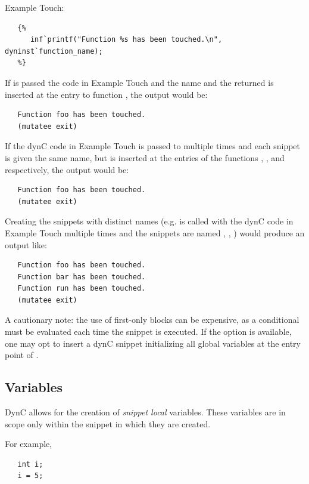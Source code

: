 \noindent Example Touch:
\begin{lstlisting}
   {%
      inf`printf("Function %s has been touched.\n", dyninst`function_name);
   %}
\end{lstlisting}

If  is passed the code in Example Touch and the name
 and the returned  is inserted at the entry to function , the output would be:
\begin{lstlisting}
   Function foo has been touched.
   (mutatee exit)
\end{lstlisting}

If the dynC code in Example Touch is passed to  multiple times and each snippet is given the same name, but is inserted at the entries of the functions , , and  respectively, the output would be:

\begin{lstlisting}
   Function foo has been touched.
   (mutatee exit)
\end{lstlisting}

Creating the snippets with distinct names (e.g.  is called with the dynC code in Example Touch multiple times and the snippets are named , , ) would produce an output like:

\begin{lstlisting}
   Function foo has been touched.
   Function bar has been touched.
   Function run has been touched.
   (mutatee exit)
\end{lstlisting}

A cautionary note: the use of first-only blocks can be expensive, as a
conditional must be evaluated each time the snippet is executed. If the option
is available, one may opt to insert a dynC snippet initializing all global
variables at the entry point of .

\subsection{Variables}

DynC allows for the creation of \textit{snippet local} variables. These
variables are in scope only within the snippet in which they are created.

\noindent For example,

\begin{lstlisting}
   int i;
   i = 5;
\end{lstlisting}

